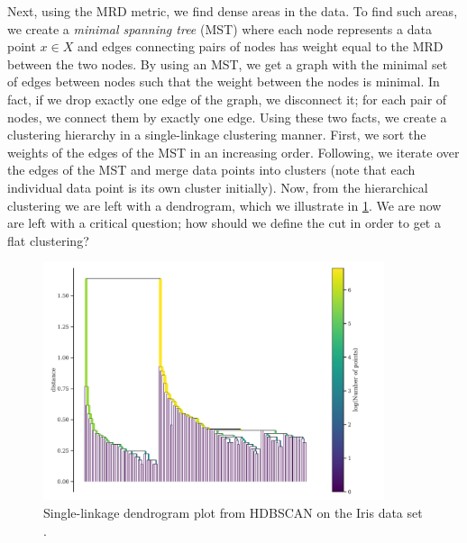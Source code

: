 Next, using the MRD metric, we find dense areas in the data. To find such areas, we create a \textit{minimal spanning tree} (MST) where each node represents a data point $x \in X$ and edges connecting pairs of nodes has weight equal to the MRD between the two nodes. By using an MST, we get a graph with the minimal set of edges between nodes such that the weight between the nodes is minimal. In fact, if we drop exactly one edge of the graph, we disconnect it; for each pair of nodes, we connect them by exactly one edge. Using these two facts, we create a clustering hierarchy in a single-linkage clustering manner. First, we sort the weights of the edges of the MST in an increasing order. Following, we iterate over the edges of the MST and merge data points into clusters (note that each individual data point is its own cluster initially). Now, from the hierarchical clustering we are left with a dendrogram, which we illustrate in \cref{fig:hdbscan-dendrogram-example}. We are now are left with a critical question; how should we define the cut in order to get a flat clustering?
\begin{figure}[H]
    \centering
    \includegraphics[width=10cm]{thesis/figures/hdbscan-single-linage-tree-example.pdf}
    \caption{Single-linkage dendrogram plot from HDBSCAN on the Iris data set \cite{Fisher1936}.}
    \label{fig:hdbscan-dendrogram-example}
\end{figure}

